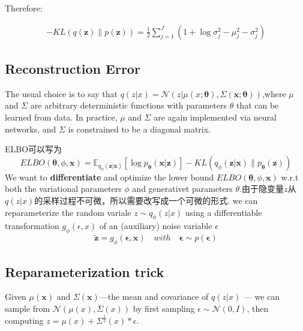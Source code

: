 Therefore:

\begin{equation}
    \begin{split}
        - KL(q(\mathbf{z})\|p(\mathbf{z})) = \frac{1}{2}\sum^J_{j=1}(1 + \log\sigma_j^2 - \mu_j^2 - \sigma_j^2)
    \end{split}
\end{equation}


\subsection{Reconstruction Error}
The usual choice is to say that $q(z|x) = \mathcal{N}(z| \mu(x; \boldsymbol{\theta}), \Sigma(\mathbf{x}; \boldsymbol{\theta}))$,where
$\mu$ and $\Sigma$ are arbitrary deterministic functions with parameters $\theta$ that can be learned from data. In practice, $\mu$ and $\Sigma$
are again implemented via neural networks, and $\Sigma$ is constrained to be a diagonal matrix.

ELBO可以写为
\begin{equation}
    ELBO(\boldsymbol{\theta}, \phi, \mathbf{x}) 
    = \mathbb{E}_{q_{\phi}(\mathbf{z}|\mathbf{x})} [\log p_{\boldsymbol{\theta}}(\mathbf{x} | \mathbf{z})] 
        - KL(q_{\phi}(\mathbf{z}|\mathbf{x})\|p_{\boldsymbol{\theta}}(\mathbf{z}))
\end{equation}
We want to \textbf{differentiate} and optimize the lower bound $ELBO(\boldsymbol{\theta}, \phi, \mathbf{x})$ w.r.t both the variational
parameters $\phi$ and generativet parameters $\theta$.由于隐变量$z$从$q(z|x)$的采样过程不可微，所以需要改写成一个可微的形式.
we can reparameterize the random variale $z \sim  q_{\phi}(z|x)$ using a differentiable transformation $g_{\phi}(\epsilon, x)$ of an 
(auxiliary) noise variable $\epsilon$
\begin{equation}
    \tilde{\mathbf{z}} = g_{\phi}(\boldsymbol{\epsilon}, \mathbf{x}) \quad with \quad \boldsymbol{\epsilon} \sim p(\boldsymbol{\epsilon})
\end{equation}

\subsection{Reparameterization trick}
Given $\mu(\mathbf{x})$ and $\Sigma(\mathbf{x})$—the mean and covariance of $q(z|x)$ — we can sample from
$\mathcal{N}(\mu(x), \Sigma(x))$ by first sampling $\epsilon \sim \mathcal{N}(0, I)$, then computing 
$z = \mu(x) + \Sigma^{\frac{1}{2}}(x) * \epsilon$.

